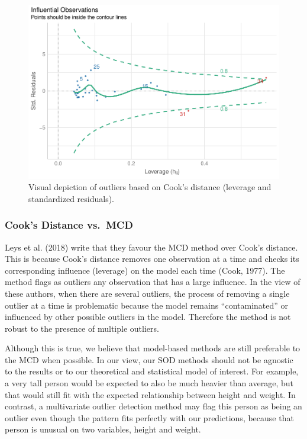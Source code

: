 \documentclass[
]{article}
\begin{document}
\begin{figure}
\includegraphics[width=1\linewidth]{paper_files/figure-latex/model-1} \caption{Visual depiction of outliers based on Cook's distance (leverage and standardized residuals).}\label{fig:model}
\end{figure}

\hypertarget{cooks-distance-vs.-mcd}{%
\subsubsection{Cook's Distance vs.~MCD}\label{cooks-distance-vs.-mcd}}

Leys et al. (2018) write that they favour the MCD method over Cook's distance. This is because Cook's distance removes one observation at a time and checks its corresponding influence (leverage) on the model each time (Cook, 1977). The method flags as outliers any observation that has a large influence. In the view of these authors, when there are several outliers, the process of removing a single outlier at a time is problematic because the model remains ``contaminated'' or influenced by other possible outliers in the model. Therefore the method is not robust to the presence of multiple outliers.

Although this is true, we believe that model-based methods are still preferable to the MCD when possible. In our view, our SOD methods should not be agnostic to the results or to our theoretical and statistical model of interest. For example, a very tall person would be expected to also be much heavier than average, but that would still fit with the expected relationship between height and weight. In contrast, a multivariate outlier detection method may flag this person as being an outlier even though the pattern fits perfectly with our predictions, because that person is unusual on two variables, height and weight.
\end{document}
